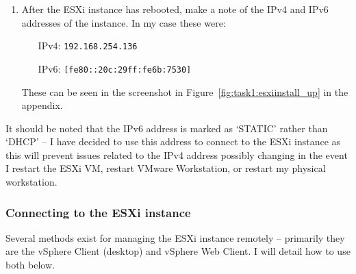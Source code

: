 \begin{enumerate}[resume*=task1methodology]
\begin{enumerate}[label=(\alph*)]
      \item After the ESXi instance has rebooted, make a note of the IPv4 and IPv6 addresses of the instance. In my case these were:
      \begin{itemize}[leftmargin=1.5cm]
        \item [IPv4:] \texttt{192.168.254.136}
        \item [IPv6:] \texttt{[fe80::20c:29ff:fe6b:7530]}
      \end{itemize}
      These can be seen in the screenshot in Figure~\ref{fig:task1:esxiinstall_up} in the  appendix.
    \end{enumerate}
\end{enumerate}

\noindent It should be noted that the IPv6 address is marked as `STATIC' rather than `DHCP' -- I have decided to use this address to connect to the ESXi instance as this will prevent issues related to the IPv4 address possibly changing in the event I restart the ESXi VM, restart VMware Workstation, or restart my physical workstation.

\subsubsection*{Connecting to the ESXi instance}
Several methods exist for managing the ESXi instance remotely -- primarily they are the vSphere Client (desktop) and vSphere Web Client. I will detail how to use both below.

